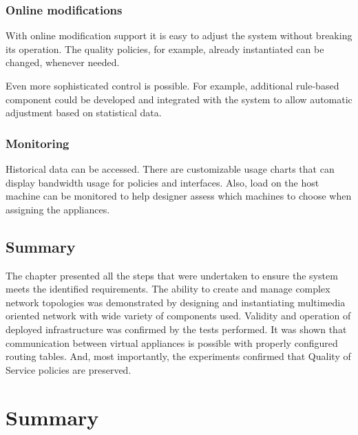 \documentclass[11pt]{book}
\begin{document}


      \subsection{Online modifications}
      \label{sub:uc:enhance:online}

        With online modification support it is easy to adjust the system without breaking its operation. The quality
        policies, for example, already instantiated can be changed, whenever needed.

        Even more sophisticated control is possible. For example, additional rule-based component could be developed and
        integrated with the system to allow automatic adjustment based on statistical data.


      \subsection{Monitoring}
      \label{sub:uc:enhance:monitoring}

        Historical data can be accessed. There are customizable usage charts that can display bandwidth usage for
        policies and interfaces. Also, load on the host machine can be monitored to help designer assess which machines
        to choose when assigning the appliances.


    \section*{Summary}

      The chapter presented all the steps that were undertaken to ensure the system meets the identified requirements.
      The ability to create and manage complex network topologies was demonstrated by designing and instantiating
      multimedia oriented network with wide variety of components used. Validity and operation of deployed
      infrastructure was confirmed by the tests performed. It was shown that communication between virtual appliances is
      possible with properly configured routing tables. And, most importantly, the experiments confirmed that Quality of
      Service policies are preserved.


  \chapter{Summary}
\end{document}
